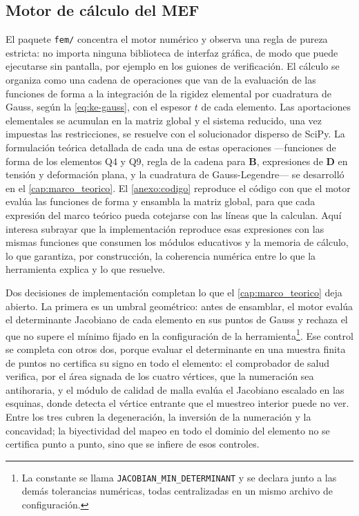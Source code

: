 \subsection{Motor de cálculo del MEF}
\label{sec:motor}

El paquete \texttt{fem/} concentra el motor numérico y observa una regla de pureza estricta: no importa ninguna biblioteca de interfaz gráfica, de modo que puede ejecutarse sin pantalla, por ejemplo en los guiones de verificación. El cálculo se organiza como una cadena de operaciones que van de la evaluación de las funciones de forma a la integración de la rigidez elemental por cuadratura de Gauss, según la \autoref{eq:ke-gauss}, con el espesor $t$ de cada elemento. Las aportaciones elementales se acumulan en la matriz global y el sistema reducido, una vez impuestas las restricciones, se resuelve con el solucionador disperso de SciPy. La formulación teórica detallada de cada una de estas operaciones —funciones de forma de los elementos Q4 y Q9, regla de la cadena para $\bm{B}$, expresiones de $\bm{D}$ en tensión y deformación plana, y la cuadratura de Gauss-Legendre— se desarrolló en el \autoref{cap:marco_teorico}. El \autoref{anexo:codigo} reproduce el código con que el motor evalúa las funciones de forma y ensambla la matriz global, para que cada expresión del marco teórico pueda cotejarse con las líneas que la calculan. Aquí interesa subrayar que la implementación reproduce esas expresiones con las mismas funciones que consumen los módulos educativos y la memoria de cálculo, lo que garantiza, por construcción, la coherencia numérica entre lo que la herramienta explica y lo que resuelve.

Dos decisiones de implementación completan lo que el \autoref{cap:marco_teorico} deja abierto. La primera es un umbral geométrico: antes de ensamblar, el motor evalúa el determinante Jacobiano de cada elemento en sus puntos de Gauss y rechaza el que no supere el mínimo fijado en la configuración de la herramienta\footnote{La constante se llama \texttt{JACOBIAN\_MIN\_DETERMINANT} y se declara junto a las demás tolerancias numéricas, todas centralizadas en un mismo archivo de configuración.}. Ese control se completa con otros dos, porque evaluar el determinante en una muestra finita de puntos no certifica su signo en todo el elemento: el comprobador de salud verifica, por el área signada de los cuatro vértices, que la numeración sea antihoraria, y el módulo de calidad de malla evalúa el Jacobiano escalado en las esquinas, donde detecta el vértice entrante que el muestreo interior puede no ver. Entre los tres cubren la degeneración, la inversión de la numeración y la concavidad; la biyectividad del mapeo en todo el dominio del elemento no se certifica punto a punto, sino que se infiere de esos controles.

